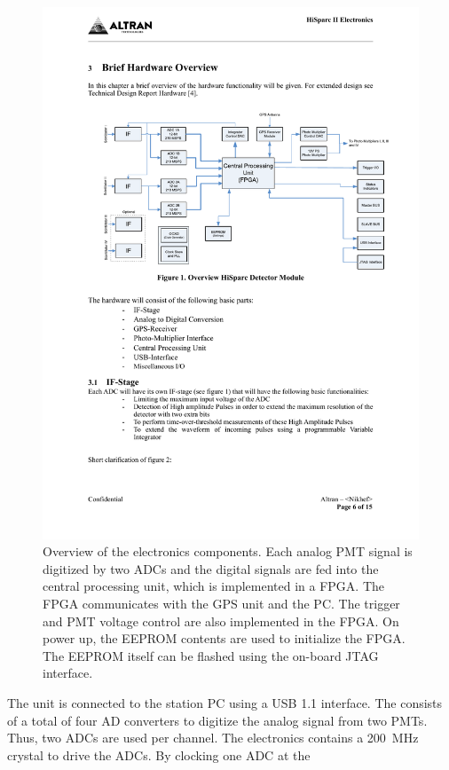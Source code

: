 \begin{figure}
\centering
\includegraphics[width=\linewidth]{figures/electronics-schematics}
\caption{Overview of the \hisparc electronics components. Each analog PMT
signal is digitized by two ADCs and the digital signals are fed into the central
processing unit, which is implemented in a FPGA. The FPGA communicates with the
GPS unit and the PC. The trigger and PMT voltage control are also implemented in
the FPGA.
On power up, the EEPROM contents are used to initialize the FPGA. The EEPROM
itself can be flashed using the on-board JTAG interface.}
\label{fig:electronics-schematics}
\end{figure}
The unit is connected to the station PC using a USB 1.1 interface. The \daq
consists of a total of four AD converters to digitize the analog signal from two
PMTs. Thus, two ADCs are used per channel. The electronics contains a
\SI{200}{\mega\hertz} crystal to drive the ADCs. By clocking one ADC at the
